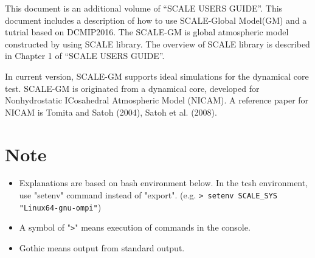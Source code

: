
This document is an additional volume of ``SCALE USERS GUIDE''.
This document includes a description of how to use SCALE-Global Model(GM) and a tutrial based on DCMIP2016.
The SCALE-GM is global atmospheric model constructed by using SCALE library.
The overview of SCALE library is described in Chapter 1 of ``SCALE USERS GUIDE''.

In current version, SCALE-GM supports ideal simulations for the dynamical core test.
SCALE-GM is originated from a dynamical core, developed for Nonhydrostatic ICosahedral Atmospheric Model (NICAM).
A reference paper for NICAM is
Tomita and Satoh (2004), Satoh et al. (2008).

\section{Note}
 \begin{itemize}
   \item Explanations are based on bash environment below.
         In the tcsh environment, use "setenv" command instead of "export".
         (e.g. \verb|> setenv SCALE_SYS "Linux64-gnu-ompi"|)
   \item A symbol of "\verb|>|" means execution of commands in the console.
   \item Gothic means output from standard output.
 \end{itemize}

